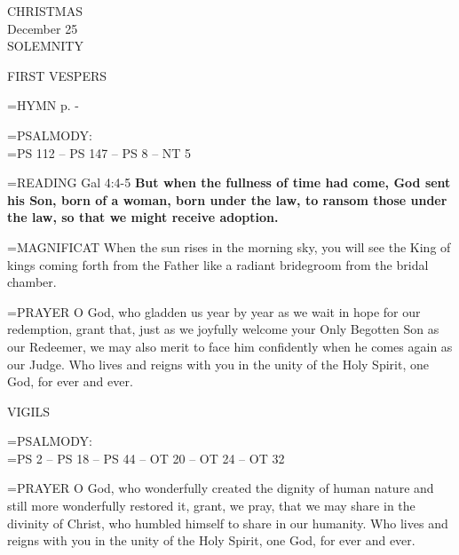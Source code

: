 \begin{center}\normalsize CHRISTMAS\\
\footnotesize December 25\\
\footnotesize SOLEMNITY\\
\end{center}

\begin{flushleft}\normalsize FIRST VESPERS\\\end{flushleft}

\label{christmas:nativity}

\hangindent=\parindent \small{\uppercase{HYMN} p.  \pageref{christmas:firstHymn} - \pageref{christmas:lastHymn}\\}

\hangindent=\parindent \small{PSALMODY:}\\
\hangindent=\parindent  PS 112 -- PS 147 -- PS 8 -- NT 5\vspace{0.5em}

\hangindent=\parindent \small{READING}    Gal 4:4-5 \textbf{   But when the fullness of time had come, God sent his Son, born of a woman, born under the law, to ransom those under the law, so that we might receive adoption.\\}

\hangindent=\parindent \small{MAGNIFICAT 	When the sun rises in the morning sky, you will see the King of kings coming forth from the Father like a radiant bridegroom from the bridal chamber.\\}

\hangindent=\parindent \small{PRAYER 	O God, who gladden us year by year as we wait in hope for our redemption, grant that, just as we joyfully welcome your Only Begotten Son as our Redeemer, we may also merit to face him confidently when he comes again as our Judge. Who lives and reigns with you in the unity of the Holy Spirit, one God, for ever and ever.}

\begin{flushleft}\normalsize VIGILS\\\end{flushleft}

\hangindent=\parindent \small{PSALMODY:}\\
\hangindent=\parindent  PS 2 -- PS 18 -- PS 44 -- OT 20 -- OT 24 -- OT 32\vspace{0.5em}

\hangindent=\parindent \small{PRAYER 	O God, who wonderfully created the dignity of human nature and still more wonderfully restored it, grant, we pray, that we may share in the divinity of Christ, who humbled himself to share in our humanity. Who lives and reigns with you in the unity of the Holy Spirit, one God, for ever and ever.}


